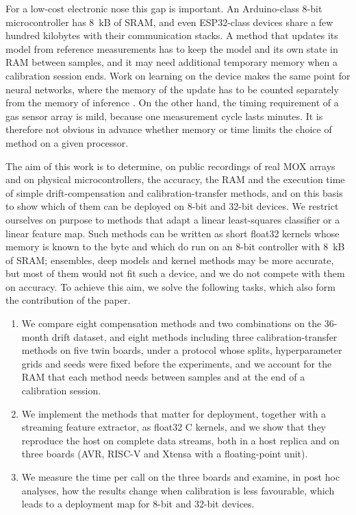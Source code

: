 \documentclass[journal,twoside,web]{ieeecolor}
\begin{document}
For a low-cost electronic nose this gap is important. An Arduino-class 8-bit microcontroller has 8~kB of SRAM, and even ESP32-class devices share a few hundred kilobytes with their communication stacks. A method that updates its model from reference measurements has to keep the model and its own state in RAM between samples, and it may need additional temporary memory when a calibration session ends. Work on learning on the device makes the same point for neural networks, where the memory of the update has to be counted separately from the memory of inference \cite{tinytrain}. On the other hand, the timing requirement of a gas sensor array is mild, because one measurement cycle lasts minutes. It is therefore not obvious in advance whether memory or time limits the choice of method on a given processor.

The aim of this work is to determine, on public recordings of real MOX arrays and on physical microcontrollers, the accuracy, the RAM and the execution time of simple drift-compensation and calibration-transfer methods, and on this basis to show which of them can be deployed on 8-bit and 32-bit devices. We restrict ourselves on purpose to methods that adapt a linear least-squares classifier or a linear feature map. Such methods can be written as short float32 kernels whose memory is known to the byte and which do run on an 8-bit controller with 8~kB of SRAM; ensembles, deep models and kernel methods may be more accurate, but most of them would not fit such a device, and we do not compete with them on accuracy. To achieve this aim, we solve the following tasks, which also form the contribution of the paper.
\begin{enumerate}
\item We compare eight compensation methods and two combinations on the 36-month drift dataset, and eight methods including three calibration-transfer methods on five twin boards, under a protocol whose splits, hyperparameter grids and seeds were fixed before the experiments, and we account for the RAM that each method needs between samples and at the end of a calibration session.
\item We implement the methods that matter for deployment, together with a streaming feature extractor, as float32 C kernels, and we show that they reproduce the host on complete data streams, both in a host replica and on three boards (AVR, RISC-V and Xtensa with a floating-point unit).
\item We measure the time per call on the three boards and examine, in post hoc analyses, how the results change when calibration is less favourable, which leads to a deployment map for 8-bit and 32-bit devices.
\end{enumerate}
\end{document}
